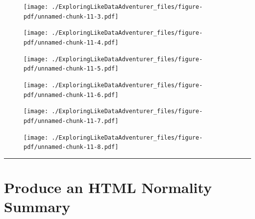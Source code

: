 \documentclass[
  letterpaper,
  DIV=11,
  numbers=noendperiod]{scrreprt}
\begin{document}
\begin{figure}[H]

{\centering \texttt{[image: ./ExploringLikeDataAdventurer\_files/figure-pdf/unnamed-chunk-11-3.pdf]}

}

\end{figure}

\begin{figure}[H]

{\centering \texttt{[image: ./ExploringLikeDataAdventurer\_files/figure-pdf/unnamed-chunk-11-4.pdf]}

}

\end{figure}

\begin{figure}[H]

{\centering \texttt{[image: ./ExploringLikeDataAdventurer\_files/figure-pdf/unnamed-chunk-11-5.pdf]}

}

\end{figure}

\begin{figure}[H]

{\centering \texttt{[image: ./ExploringLikeDataAdventurer\_files/figure-pdf/unnamed-chunk-11-6.pdf]}

}

\end{figure}

\begin{figure}[H]

{\centering \texttt{[image: ./ExploringLikeDataAdventurer\_files/figure-pdf/unnamed-chunk-11-7.pdf]}

}

\end{figure}

\begin{figure}[H]

{\centering \texttt{[image: ./ExploringLikeDataAdventurer\_files/figure-pdf/unnamed-chunk-11-8.pdf]}

}

\end{figure}

\begin{center}\rule{0.5\linewidth}{0.5pt}\end{center}

\hypertarget{produce-an-html-normality-summary}{%
\section{Produce an HTML Normality
Summary}\label{produce-an-html-normality-summary}}
\end{document}
